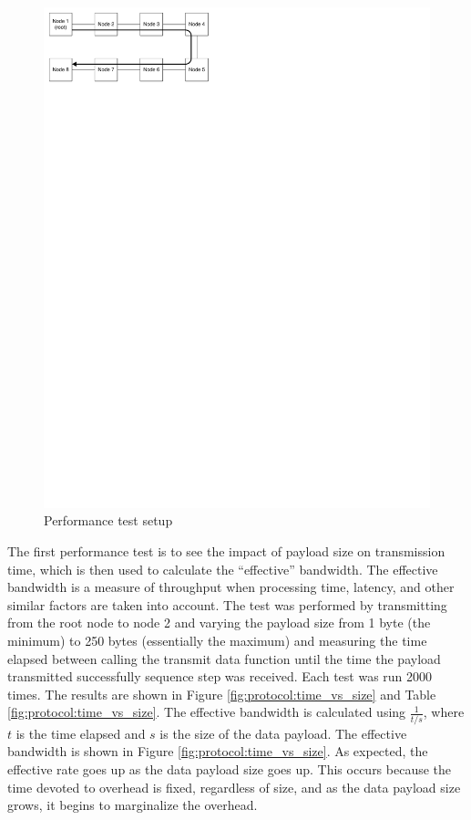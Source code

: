 \begin{figure}[ptb]
	\begin{centering}
		\includegraphics{Protocol/Figures/protocol-performance_test.pdf}
		\caption{Performance test setup}
		\label{fig:protocol:performance_test}
	\end{centering}
\end{figure}

The first performance test is to see the impact of payload size on transmission time, which is then used to calculate the ``effective'' bandwidth. The effective bandwidth is a measure of throughput when processing time, latency, and other similar factors are taken into account. The test was performed by transmitting from the root node to node 2 and varying the payload size from 1 byte (the minimum) to 250 bytes (essentially the maximum) and measuring the time elapsed between calling the transmit data function until the time the payload transmitted successfully sequence step was received. Each test was run 2000 times. The results are shown in Figure \ref{fig:protocol:time_vs_size} and Table \ref{fig:protocol:time_vs_size}. The effective bandwidth is calculated using $\frac{1}{t / s} $, where $t$ is the time elapsed and $s$ is the size of the data payload. The effective bandwidth is shown in Figure \ref{fig:protocol:time_vs_size}. As expected, the effective rate goes up as the data payload size goes up. This occurs because the time devoted to overhead is fixed, regardless of size, and as the data payload size grows, it begins to marginalize the overhead.

